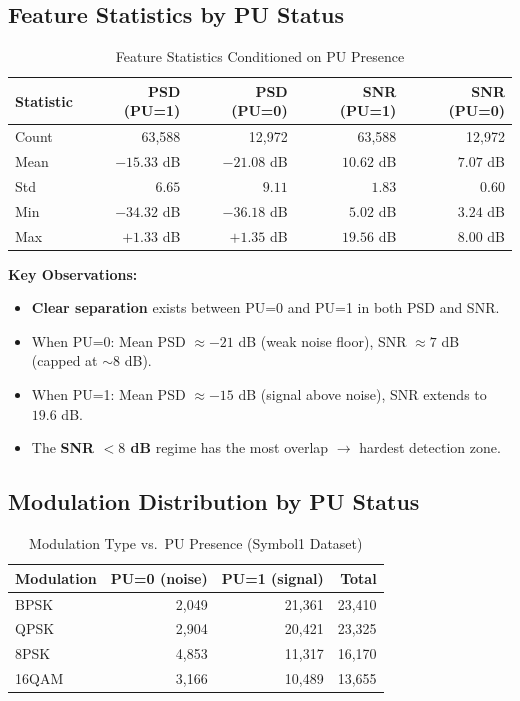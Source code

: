 \documentclass[12pt, a4paper]{article}
\begin{document}
\subsection{Feature Statistics by PU Status}

\begin{table}[H]
\centering
\caption{Feature Statistics Conditioned on PU Presence}
\label{tab:feature_stats}
\begin{tabular}{@{}lrrrr@{}}
\toprule
\textbf{Statistic} & \textbf{PSD (PU=1)} & \textbf{PSD (PU=0)} & \textbf{SNR (PU=1)} & \textbf{SNR (PU=0)} \\
\midrule
Count & 63{,}588  & 12{,}972  & 63{,}588 & 12{,}972 \\
Mean  & $-15.33$ dB & $-21.08$ dB & $10.62$ dB & $7.07$ dB \\
Std   & $6.65$     & $9.11$     & $1.83$    & $0.60$ \\
Min   & $-34.32$ dB & $-36.18$ dB & $5.02$ dB  & $3.24$ dB \\
Max   & $+1.33$ dB  & $+1.35$ dB  & $19.56$ dB & $8.00$ dB \\
\bottomrule
\end{tabular}
\end{table}

\textbf{Key Observations:}
\begin{itemize}[leftmargin=1.5em]
    \item \textbf{Clear separation} exists between PU=0 and PU=1 in both PSD and SNR.
    \item When PU=0: Mean PSD $\approx -21$ dB (weak noise floor), SNR $\approx 7$ dB (capped at $\sim$8 dB).
    \item When PU=1: Mean PSD $\approx -15$ dB (signal above noise), SNR extends to $19.6$ dB.
    \item The \textbf{SNR $< 8$ dB} regime has the most overlap $\rightarrow$ hardest detection zone.
\end{itemize}


\subsection{Modulation Distribution by PU Status}

\begin{table}[H]
\centering
\caption{Modulation Type vs.\ PU Presence (Symbol1 Dataset)}
\label{tab:mod_dist}
\begin{tabular}{@{}lrrr@{}}
\toprule
\textbf{Modulation} & \textbf{PU=0 (noise)} & \textbf{PU=1 (signal)} & \textbf{Total} \\
\midrule
BPSK   & 2{,}049  & 21{,}361 & 23{,}410 \\
QPSK   & 2{,}904  & 20{,}421 & 23{,}325 \\
8PSK   & 4{,}853  & 11{,}317 & 16{,}170 \\
16QAM  & 3{,}166  & 10{,}489 & 13{,}655 \\
\bottomrule
\end{tabular}
\end{table}
\end{document}
